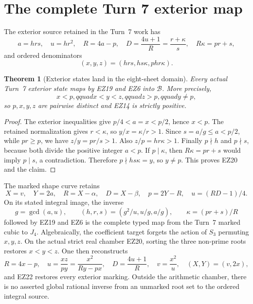 \documentclass[11pt]{article}
\newtheorem{theorem}{Theorem}[section]
\theoremstyle{definition}\newtheorem{definition}[theorem]{Definition}
\theoremstyle{remark}\newtheorem{remark}[theorem]{Remark}
\begin{document}
\section{The complete Turn 7 exterior map}

The exterior source retained in the Turn~7 work has
\begin{equation}
 a=hrs,\quad u=hr^2,\quad R=4a-p,\quad
 D=\frac{4u+1}{R}=\frac{r+\kappa}{s},\quad
 R\kappa=pr+s,                                         \tag{EZ18}
\end{equation}
and ordered denominators
\begin{equation}
 (x,y,z)=(hrs,hs\kappa,phr\kappa).                     \tag{EZ19}
\end{equation}

\begin{theorem}[Exterior states land in the eight-sheet domain]
Every actual Turn~7 exterior state maps by EZ19 and EZ6 into \(\mathcal B\).
More precisely,
\begin{equation}
 x<p,qquad x<y<z,qquad z>p,qquad y\ne p,             \tag{EZ20}
\end{equation}
so \(p,x,y,z\) are pairwise distinct and EZ14 is strictly positive.
\end{theorem}

\begin{proof}
The exterior inequalities give \(p/4<a=x<p/2\), hence \(x<p\).
The retained normalization gives \(r<\kappa\), so
\(y/x=\kappa/r>1\).  Since \(s=a/g\le a<p/2\), while \(pr\ge p\),
we have \(z/y=pr/s>1\).  Also \(z/p=hr\kappa>1\).
Finally \(p\nmid h\) and \(p\nmid s\), because both divide the positive
integer \(a<p\).  If \(p\mid\kappa\), then
\(R\kappa=pr+s\) would imply \(p\mid s\), a contradiction.  Therefore
\(p\nmid hs\kappa=y\), so \(y\ne p\).  This proves EZ20 and the claim.
\end{proof}

The marked shape curve retains
\begin{equation}
 X=v,\quad Y=2a,\quad R=X-\alpha,\quad D=X-\beta,\quad
 p=2Y-R,\quad u=(RD-1)/4.                               \tag{EZ21}
\end{equation}
On its stated integral image, the inverse
\begin{equation}
 g=\gcd(a,u),\qquad
 (h,r,s)=(g^2/u,u/g,a/g),\qquad
 \kappa=(pr+s)/R                                       \tag{EZ22}
\end{equation}
followed by EZ19 and EZ6 is the complete typed map from the Turn~7 marked
cubic to \(J_4\).  Algebraically, the coefficient target forgets the action
of \(S_3\) permuting \(x,y,z\).  On the actual strict real chamber EZ20,
sorting the three non-prime roots restores \(x<y<z\).  One then reconstructs
\begin{equation}
 R=4x-p,\quad u=\frac{xz}{py}=\frac{x^2}{Ry-px},\quad
 D=\frac{4u+1}{R},\quad v=\frac{x^2}{u},\quad
 (X,Y)=(v,2x),                                         \tag{EZ23}
\end{equation}
and EZ22 restores every exterior marking.  Outside the arithmetic chamber,
there is no asserted global rational inverse from an unmarked root set to the
ordered integral source.
\end{document}
